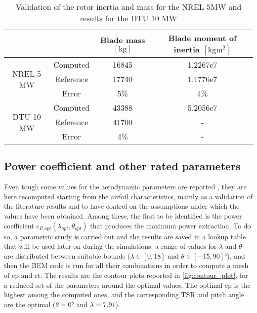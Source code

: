 \begin{table}[htb]
 \caption{Validation of the rotor inertia and mass for the NREL 5MW and results for the DTU 10 MW}
\centering
	\begin{tabular}{cccc}
		\toprule
    & & Blade mass $\left[\si{\kilo\gram}\right]$ & Blade moment of inertia $\left[\si{\kilo\gram\square\meter}\right]$\\ \midrule
    \multirow{3}{*}{NREL 5 MW}		     &  Computed 	& 16845	&  1.2267e7\\
      & Reference	\cite{NREL_5MW_reference} & 17740 &  1.1776e7\\ 
      & Error & 5\% &4\% \\ \midrule
    \multirow{3}{*}{DTU 10 MW}& Computed    &  43388 & 5.2056e7\\
& Reference \cite{review_of_scaling_low} & 41700 & -\\
& Error & 4\% & -  \\  
		\bottomrule
	\end{tabular}
 \label{tab:rotor_inertia}
\end{table}

\subsection{Power coefficient and other rated parameters}\label{subsec:lookup_cp}
Even tough some values for the aerodynamic parameters are reported \cite{DTU_Wind_Energy_Report-I-0092}, they are here recomputed starting from the airfoil characteristics, mainly as a validation of the literature results and to have control on the assumptions under which the values have been obtained. Among these, the first to be identified is the power coefficient $c_{P, opt}(\lambda_{opt}, \theta_{opt})$ that produces the maximum power extraction. To do so, a parametric study is carried out and the results are saved in a lookup table that will be used later on during the simulations: a range of values for $\lambda$ and $\theta$ are distributed between suitable bounds ($\lambda \in \left[0, 18\right]$  and $\theta \in \left[-15, 90\right] \si{\degree}$), and then the \acrshort{BEM} code is run for all their combinations in order to compute a mesh of \acrshort{cp} and \acrshort{ct}. The results are the contour plots reported in \autoref{fig:contour_plot}, for a reduced set of the parameters around the optimal values. The optimal \acrlong{cp} is the highest among the computed ones, and the corresponding \acrshort{TSR} and pitch angle are the optimal ($\theta=0\si{\degree}$ and $\lambda=7.91$). 

